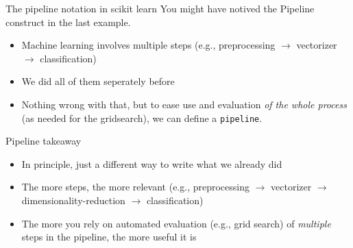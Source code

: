 \documentclass[compress]{beamer}
\begin{document}
\begin{frame}{The pipeline notation in scikit learn}
You might have notived the Pipeline construct in the last example.
	\begin{itemize}
		\item Machine learning involves multiple steps (e.g., preprocessing $\rightarrow$ vectorizer $\rightarrow$ classification)
		\item We did all of them seperately before
		\item Nothing wrong with that, but to ease use and evaluation \emph{of the whole process} (as needed for the gridsearch), we can define a \texttt{pipeline}.
	\end{itemize}
	
\end{frame}

\begin{frame}[fragile]Example with a pipeline (and add cross-validation)}
\begin{lstlisting}
from sklearn.feature_extraction.text import TfidfVectorizer
from sklearn.linear_model import LogisticRegressionCV
from sklearn.pipeline import make_pipeline

vec = TfidfVectorizer()
clf = LogisticRegressionCV()
pipe = make_pipeline(vec, clf)

pipe.fit([r[0] for r in reviews], [r[1] for r in reviews])
predictions = pipe.predict([r[0] for r in test])
\end{lstlisting}
\end{frame}

\begin{frame}{Pipeline takeaway}
	\begin{itemize}
		\item In principle, just a different way to write what we already did
		\item The more steps, the more relevant (e.g., preprocessing $\rightarrow$ vectorizer $\rightarrow$ dimensionality-reduction $\rightarrow$ classification)
		\item The more you rely on automated evaluation (e.g., grid search) of \emph{multiple} steps in the pipeline, the more useful it is
	\end{itemize}
\end{frame}
\end{document}
